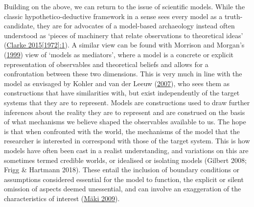 \documentclass[
  12pt,
  a4paper,
  oneside]{book}
\begin{document}
Building on the above, we can return to the issue of scientific models. While the classic hypothetico-deductive framework in a sense sees every model as a truth-candidate, they are for advocates of a model-based archaeology instead often understood as `pieces of machinery that relate observations to theoretical ideas' (\protect\hyperlink{ref-clarke1972}{Clarke 2015{[}1972{]}:1}). A similar view can be found with Morrison and Morgan's (\protect\hyperlink{ref-morrison1999}{1999}) view of `models as mediators', where a model is a concrete or explicit representation of observables and theoretical beliefs and allows for a confrontation between these two dimensions. This is very much in line with the model as envisaged by Kohler and van der Leeuw (\protect\hyperlink{ref-kohler2007}{2007}), who sees them as constructions that have similarities with, but exist independently of the target systems that they are to represent. Models are constructions used to draw further inferences about the reality they are to represent and are construed on the basis of what mechanisms we believe shaped the observables available to us. The hope is that when confronted with the world, the mechanisms of the model that the researcher is interested in correspond with those of the target system. This is how models have often been cast in a realist understanding, and variations on this are sometimes termed credible worlds, or idealised or isolating models (Gilbert 2008; Frigg \& Hartmann 2018). These entail the inclusion of boundary conditions or assumptions considered essential for the model to function, the explicit or silent omission of aspects deemed unessential, and can involve an exaggeration of the characteristics of interest (\protect\hyperlink{ref-muxe4ki2009}{Mäki 2009}).
\end{document}
